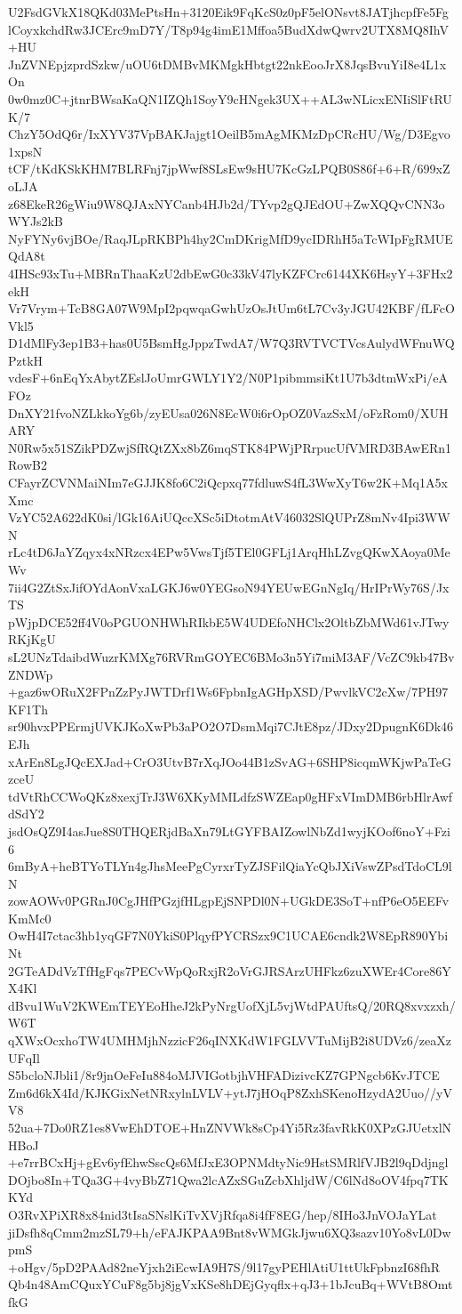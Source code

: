 U2FsdGVkX18QKd03MePtsHn+3120Eik9FqKcS0z0pF5elONsvt8JATjhcpfFe5Fg
lCoyxkchdRw3JCErc9mD7Y/T8p94g4imE1Mffoa5BudXdwQwrv2UTX8MQ8IhV+HU
JnZVNEpjzprdSzkw/uOU6tDMBvMKMgkHbtgt22nkEooJrX8JqsBvuYiI8e4L1xOn
0w0mz0C+jtnrBWsaKaQN1IZQh1SoyY9cHNgek3UX++AL3wNLicxENIiSlFtRUK/7
ChzY5OdQ6r/IxXYV37VpBAKJajgt1OeilB5mAgMKMzDpCRcHU/Wg/D3Egvo1xpsN
tCF/tKdKSkKHM7BLRFnj7jpWwf8SLsEw9sHU7KcGzLPQB0S86f+6+R/699xZoLJA
z68EkeR26gWiu9W8QJAxNYCanb4HJb2d/TYvp2gQJEdOU+ZwXQQvCNN3oWYJs2kB
NyFYNy6vjBOe/RaqJLpRKBPh4hy2CmDKrigMfD9ycIDRhH5aTcWIpFgRMUEQdA8t
4IHSc93xTu+MBRnThaaKzU2dbEwG0c33kV47lyKZFCrc6144XK6HsyY+3FHx2ekH
Vr7Vrym+TcB8GA07W9MpI2pqwqaGwhUzOsJtUm6tL7Cv3yJGU42KBF/fLFcOVkl5
D1dMlFy3ep1B3+has0U5BsmHgJppzTwdA7/W7Q3RVTVCTVcsAulydWFnuWQPztkH
vdesF+6nEqYxAbytZEslJoUmrGWLY1Y2/N0P1pibmmsiKt1U7b3dtmWxPi/eAFOz
DnXY21fvoNZLkkoYg6b/zyEUsa026N8EcW0i6rOpOZ0VazSxM/oFzRom0/XUHARY
N0Rw5x51SZikPDZwjSfRQtZXx8bZ6mqSTK84PWjPRrpucUfVMRD3BAwERn1RowB2
CFayrZCVNMaiNIm7eGJJK8fo6C2iQcpxq77fdluwS4fL3WwXyT6w2K+Mq1A5xXmc
VzYC52A622dK0si/lGk16AiUQccXSc5iDtotmAtV46032SlQUPrZ8mNv4Ipi3WWN
rLc4tD6JaYZqyx4xNRzcx4EPw5VwsTjf5TEl0GFLj1ArqHhLZvgQKwXAoya0MeWv
7ii4G2ZtSxJifOYdAonVxaLGKJ6w0YEGsoN94YEUwEGnNgIq/HrIPrWy76S/JxTS
pWjpDCE52ff4V0oPGUONHWhRIkbE5W4UDEfoNHClx2OltbZbMWd61vJTwyRKjKgU
sL2UNzTdaibdWuzrKMXg76RVRmGOYEC6BMo3n5Yi7miM3AF/VcZC9kb47BvZNDWp
+gaz6wORuX2FPnZzPyJWTDrf1Ws6FpbnIgAGHpXSD/PwvlkVC2cXw/7PH97KF1Th
sr90hvxPPErmjUVKJKoXwPb3aPO2O7DsmMqi7CJtE8pz/JDxy2DpugnK6Dk46EJh
xArEn8LgJQcEXJad+CrO3UtvB7rXqJOo44B1zSvAG+6SHP8icqmWKjwPaTeGzceU
tdVtRhCCWoQKz8xexjTrJ3W6XKyMMLdfzSWZEap0gHFxVImDMB6rbHlrAwfdSdY2
jsdOsQZ9I4asJue8S0THQERjdBaXn79LtGYFBAIZowlNbZd1wyjKOof6noY+Fzi6
6mByA+heBTYoTLYn4gJhsMeePgCyrxrTyZJSFilQiaYcQbJXiVswZPsdTdoCL9lN
zowAOWv0PGRnJ0CgJHfPGzjfHLgpEjSNPDl0N+UGkDE3SoT+nfP6eO5EEFvKmMc0
OwH4I7ctac3hb1yqGF7N0YkiS0PlqyfPYCRSzx9C1UCAE6cndk2W8EpR890YbiNt
2GTeADdVzTfHgFqs7PECvWpQoRxjR2oVrGJRSArzUHFkz6zuXWEr4Core86YX4Kl
dBvu1WuV2KWEmTEYEoHheJ2kPyNrgUofXjL5vjWtdPAUftsQ/20RQ8xvxzxh/W6T
qXWxOcxhoTW4UMHMjhNzzicF26qINXKdW1FGLVVTuMijB2i8UDVz6/zeaXzUFqIl
S5bcloNJbli1/8r9jnOeFeIu884oMJVIGotbjhVHFADizivcKZ7GPNgcb6KvJTCE
Zm6d6kX4Id/KJKGixNetNRxylnLVLV+ytJ7jHOqP8ZxhSKenoHzydA2Uuo//yVV8
52ua+7Do0RZ1es8VwEhDTOE+HnZNVWk8sCp4Yi5Rz3favRkK0XPzGJUetxlNHBoJ
+e7rrBCxHj+gEv6yfEhwSscQs6MfJxE3OPNMdtyNic9HstSMRlfVJB2l9qDdjngl
DOjbo8In+TQa3G+4vyBbZ71Qwa2lcAZxSGuZcbXhljdW/C6lNd8oOV4fpq7TKKYd
O3RvXPiXR8x84nid3tIsaSNslKiTvXVjRfqa8i4fF8EG/hep/8IHo3JnVOJaYLat
jiDsfh8qCmm2mzSL79+h/eFAJKPAA9Bnt8vWMGkJjwu6XQ3sazv10Yo8vL0DwpmS
+oHgv/5pD2PAAd82neYjxh2iEcwIA9H7S/9l17gyPEHlAtiU1ttUkFpbnzI68fhR
Qb4n48AmCQuxYCuF8g5bj8jgVxKSe8hDEjGyqflx+qJ3+1bJcuBq+WVtB8OmtfkG
